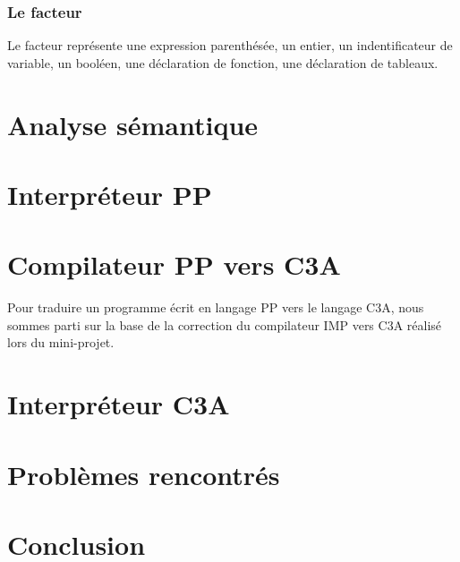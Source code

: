 \documentclass[11pt,a4paper]{article}
\begin{document}
\subsubsection{Le facteur}
Le facteur représente une expression parenthésée, un entier, un indentificateur de variable, un booléen, une déclaration de fonction, une déclaration de tableaux.


\section{Analyse sémantique}



\section{Interpréteur PP}



\section{Compilateur PP vers C3A}
Pour traduire un programme écrit en langage PP vers le langage C3A, nous sommes parti sur la base de la correction du compilateur IMP vers C3A réalisé lors du mini-projet.


\section{Interpréteur C3A}


\section{Problèmes rencontrés}


\section{Conclusion}
\end{document}
